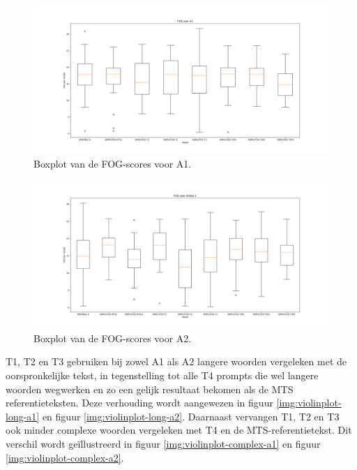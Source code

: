 \begin{figure}
	\includegraphics[width=\linewidth]{img/boxplot-fog-a1.png}
	\caption{Boxplot van de FOG-scores voor A1.}
	\label{img:boxplot-fog-a1}
\end{figure}

\begin{figure}
	\includegraphics[width=\linewidth]{img/boxplot-fog-a2.png}
	\caption{Boxplot van de FOG-scores voor A2.}
	\label{img:boxplot-fog-a2}
\end{figure}

T1, T2 en T3 gebruiken bij zowel A1 als A2 langere woorden vergeleken met de oorspronkelijke tekst, in tegenstelling tot alle T4 prompts die wel langere woorden wegwerken en zo een gelijk resultaat bekomen als de MTS referentieteksten. Deze verhouding wordt aangewezen in figuur \ref{img:violinplot-long-a1} en figuur \ref{img:violinplot-long-a2}. Daarnaast vervangen T1, T2 en T3 ook minder complexe woorden vergeleken met T4 en de MTS-referentietekst. Dit verschil wordt geïllustreerd in figuur \ref{img:violinplot-complex-a1} en figuur \ref{img:violinplot-complex-a2}.

